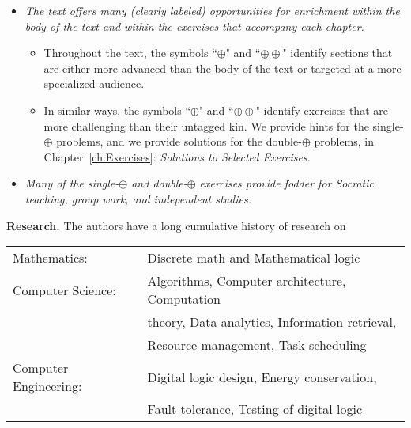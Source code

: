 \begin{itemize}
\begin{itemize}
  \item
Citations tagged ``{\bf [T/R]}" point to advanced and/or specialized {\em {\bf T}extbooks} and {\em {\bf R}eference books}.  They will lead the interested reader beyond the introductory level of this text.  For instance, our description in Appendix E of ``carry-free" addition can be a stepping stone to a study of the details of computer arithmetic.

  \item
Untagged citations identify ``modern" expositions of the material we describe in the text.  They also usually will lead the interested reader beyond the introductory level of this text.  Indeed, they are often quite technical companions to quite dramatic human interest stories.
  \end{itemize}

\item
{\em The text offers many (clearly labeled) opportunities for enrichment within the body of the text and within the exercises that accompany each chapter.}

  \begin{itemize}
  \item
Throughout the text, the symbols ``$\oplus$" and ``$\oplus \oplus$" identify sections that are either more advanced than the body of the text or targeted at a more specialized audience.
  \item
In similar ways, the symbols ``$\oplus$" and ``$\oplus \oplus$" identify exercises that are more challenging than their untagged kin.  We provide hints for the single-$\oplus$ problems, and we provide solutions for the double-$\oplus$ problems, in Chapter~\ref{ch:Exercises}: {\it Solutions to Selected Exercises}.
  \end{itemize}

\item
{\em 
Many of the single-$\oplus$ and double-$\oplus$ exercises provide fodder for Socratic teaching, group work, and independent studies.}
\end{itemize}

\bigskip


\medskip

\noindent
{\bf Research.}
The authors have a long cumulative history of research on

\noindent \begin{tabular}{ll}
{\sc Mathematics:} &
Discrete math and Mathematical logic \\
{\sc Computer Science:} &
Algorithms, Computer architecture, Computation \\ 
   & theory, Data analytics, Information retrieval, \\
   & Resource management, Task scheduling \\
{\sc Computer Engineering:} &
Digital logic design, Energy conservation, \\
  & Fault tolerance, Testing of digital logic
\end{tabular}

